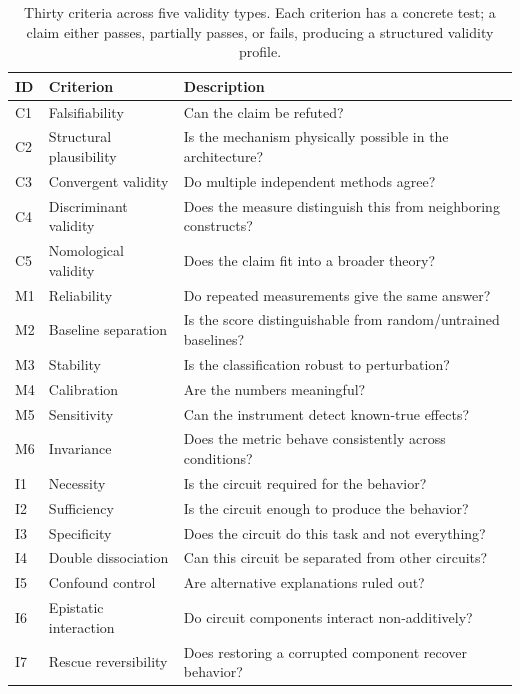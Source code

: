 \documentclass[10pt]{article}
\begin{document}
\begingroup
{}
\begin{table}[H]
\centering
\small
\caption{Thirty criteria across five validity types. Each criterion has a concrete test; a claim either passes, partially passes, or fails, producing a structured validity profile.}
\label{tab:criteria}
\renewcommand{\arraystretch}{1.15}
\begin{tabular}{@{}llp{8.5cm}@{}}
\toprule
\textbf{ID} & \textbf{Criterion} & \textbf{Description} \\
\midrule
C1 & Falsifiability & Can the claim be refuted? \\
C2 & Structural plausibility & Is the mechanism physically possible in the architecture? \\
C3 & Convergent validity & Do multiple independent methods agree? \\
C4 & Discriminant validity & Does the measure distinguish this from neighboring constructs? \\
C5 & Nomological validity & Does the claim fit into a broader theory? \\
\midrule
M1 & Reliability & Do repeated measurements give the same answer? \\
M2 & Baseline separation & Is the score distinguishable from random/untrained baselines? \\
M3 & Stability & Is the classification robust to perturbation? \\
M4 & Calibration & Are the numbers meaningful? \\
M5 & Sensitivity & Can the instrument detect known-true effects? \\
M6 & Invariance & Does the metric behave consistently across conditions? \\
\midrule
I1 & Necessity & Is the circuit required for the behavior? \\
I2 & Sufficiency & Is the circuit enough to produce the behavior? \\
I3 & Specificity & Does the circuit do this task and not everything? \\
I4 & Double dissociation & Can this circuit be separated from other circuits? \\
I5 & Confound control & Are alternative explanations ruled out? \\
I6 & Epistatic interaction & Do circuit components interact non-additively? \\
I7 & Rescue reversibility & Does restoring a corrupted component recover behavior? \\

\end{tabular}
\end{table}
\end{document}
